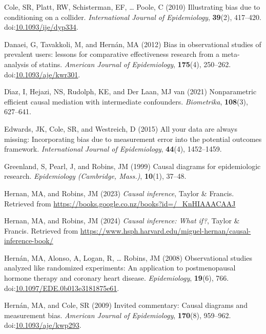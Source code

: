\documentclass[
  singlecolumn]{article}
\newlength{\cslhangindent}
\newenvironment{CSLReferences}[2] %
 {\begin{list}{}{%
  \setlength{\itemindent}{0pt}
  \setlength{\leftmargin}{0pt}
  \setlength{\parsep}{0pt}
  \ifodd #1
   \setlength{\leftmargin}{\cslhangindent}
   \setlength{\itemindent}{-1\cslhangindent}
  \fi
  \setlength{\itemsep}{#2\baselineskip}}}
 {\end{list}}
\begin{document}
\begin{CSLReferences}{1}{0}
Cole, SR, Platt, RW, Schisterman, EF, \ldots{} Poole, C (2010)
Illustrating bias due to conditioning on a collider. \emph{International
Journal of Epidemiology}, \textbf{39}(2), 417--420.
doi:\href{https://doi.org/10.1093/ije/dyp334}{10.1093/ije/dyp334}.

Danaei, G, Tavakkoli, M, and Hernán, MA (2012) Bias in observational
studies of prevalent users: lessons for comparative effectiveness
research from a meta-analysis of statins. \emph{American Journal of
Epidemiology}, \textbf{175}(4), 250--262.
doi:\href{https://doi.org/10.1093/aje/kwr301}{10.1093/aje/kwr301}.

Dı́az, I, Hejazi, NS, Rudolph, KE, and Der Laan, MJ van (2021)
Nonparametric efficient causal mediation with intermediate confounders.
\emph{Biometrika}, \textbf{108}(3), 627--641.

Edwards, JK, Cole, SR, and Westreich, D (2015) All your data are always
missing: Incorporating bias due to measurement error into the potential
outcomes framework. \emph{International Journal of Epidemiology},
\textbf{44}(4), 1452--1459.

Greenland, S, Pearl, J, and Robins, JM (1999) Causal diagrams for
epidemiologic research. \emph{Epidemiology (Cambridge, Mass.)},
\textbf{10}(1), 37--48.

Hernan, MA, and Robins, JM (2023) \emph{Causal inference}, Taylor \&
Francis. Retrieved from
\url{https://books.google.co.nz/books?id=/_KnHIAAACAAJ}

Hernan, MA, and Robins, JM (2024) \emph{Causal inference: What if?},
Taylor \& Francis. Retrieved from
\url{https://www.hsph.harvard.edu/miguel-hernan/causal-inference-book/}

Hernán, MA, Alonso, A, Logan, R, \ldots{} Robins, JM (2008)
Observational studies analyzed like randomized experiments: An
application to postmenopausal hormone therapy and coronary heart
disease. \emph{Epidemiology}, \textbf{19}(6), 766.
doi:\href{https://doi.org/10.1097/EDE.0b013e3181875e61}{10.1097/EDE.0b013e3181875e61}.

Hernán, MA, and Cole, SR (2009) Invited commentary: Causal diagrams and
measurement bias. \emph{American Journal of Epidemiology},
\textbf{170}(8), 959--962.
doi:\href{https://doi.org/10.1093/aje/kwp293}{10.1093/aje/kwp293}.


\end{CSLReferences}
\end{document}
